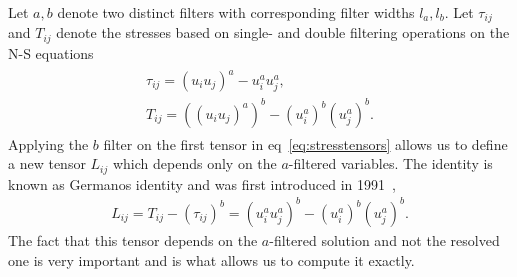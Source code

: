 Let $a,b$ denote two distinct filters with corresponding filter widths $l_a,l_b$. 
Let $\tau_{ij}$ and $T_{ij}$ denote the stresses based on single- and double filtering
operations on the N-S equations
\begin{align}
    \begin{split}
    \tau_{ij} = (u_iu_j)^a - u_i^au_j^a,\\
    T_{ij} = ((u_iu_j)^a)^b - (u_i^a)^b(u_j^a)^b.
    \end{split}
    \label{eq:stresstensors}
\end{align}
Applying the $b$ filter on the first tensor in eq~\ref{eq:stresstensors} allows us to define 
a new tensor $L_{ij}$ which depends only on the $a$-filtered variables. The identity 
is known as Germanos identity and was first introduced in 1991~\cite{Germano91},
\begin{align}
    L_{ij} = T_{ij} - (\tau_{ij})^b
    = (u_i^au_j^a)^b - (u_i^a)^b(u_j^a)^b.
    \label{eq:germanoid}
\end{align}
The fact that this tensor depends on the $a$-filtered solution and not the resolved 
one is very important and is what allows us to compute it exactly.

